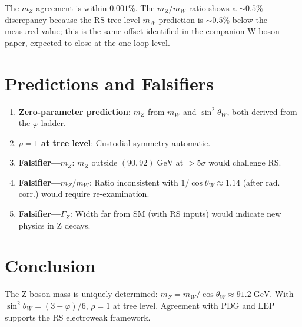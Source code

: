 \documentclass[12pt,a4paper]{article}
\theoremstyle{definition}
\theoremstyle{remark}
\begin{document}
The $m_Z$ agreement is within $0.001\%$.  The $m_Z/m_W$ ratio shows
a $\sim 0.5\%$ discrepancy because the RS tree-level $m_W$ prediction
is $\sim 0.5\%$ below the measured value; this is the same offset
identified in the companion W-boson paper, expected to close at
the one-loop level.

\section{Predictions and Falsifiers}
\label{sec:predictions}

\begin{enumerate}
  \item \textbf{Zero-parameter prediction}: $m_Z$ from $m_W$ and
  $\sin^2\theta_W$, both derived from the $\varphi$-ladder.

  \item \textbf{$\rho = 1$ at tree level}: Custodial symmetry automatic.

  \item \textbf{Falsifier---$m_Z$}: $m_Z$ outside $(90, 92)\;\mathrm{GeV}$
  at $> 5\sigma$ would challenge RS.

  \item \textbf{Falsifier---$m_Z/m_W$}: Ratio inconsistent with
  $1/\cos\theta_W \approx 1.14$ (after rad. corr.) would require
  re-examination.

  \item \textbf{Falsifier---$\Gamma_Z$}: Width far from SM (with RS
  inputs) would indicate new physics in Z decays.
\end{enumerate}

\section{Conclusion}
\label{sec:conclusion}

The Z boson mass is uniquely determined: $m_Z = m_W/\cos\theta_W
\approx 91.2\;\mathrm{GeV}$.  With $\sin^2\theta_W = (3-\varphi)/6$,
$\rho = 1$ at tree level.  Agreement with PDG and LEP supports the
RS electroweak framework.
\end{document}
